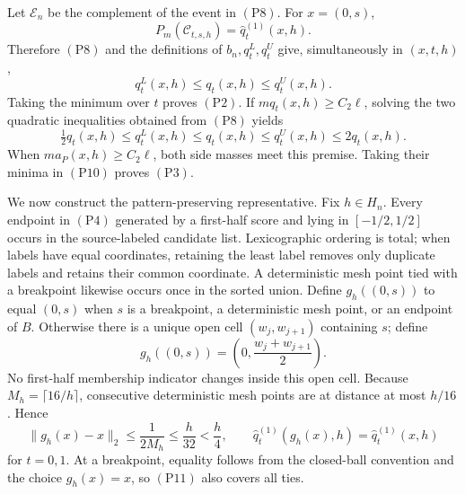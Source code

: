 Let \(\mathcal E_n\) be the complement of the event in \((\mathrm{P8})\).
For \(x=(0,s)\),
\[
 P_m(\mathcal C_{t,s,h})=\widehat q_t^{(1)}(x,h).
\]
Therefore \((\mathrm{P8})\) and the definitions of \(b_n,q_t^L,q_t^U\)
give, simultaneously in \((x,t,h)\),
\[
 q_t^L(x,h)\leq q_t(x,h)\leq q_t^U(x,h).                          \tag{P9}
\]
Taking the minimum over \(t\) proves \((\mathrm{P2})\).  If
\(mq_t(x,h)\geq C_2\ell\), solving the two quadratic inequalities obtained
from \((\mathrm{P8})\) yields
\[
 \tfrac12q_t(x,h)\leq q_t^L(x,h)
 \leq q_t(x,h)\leq q_t^U(x,h)\leq2q_t(x,h).                       \tag{P10}
\]
When \(ma_P(x,h)\geq C_2\ell\), both side masses meet this premise.
Taking their minima in \((\mathrm{P10})\) proves \((\mathrm{P3})\).

We now construct the pattern-preserving representative.  Fix \(h\in H_n\).
Every endpoint in \((\mathrm{P4})\) generated by a first-half score and lying
in \([-1/2,1/2]\) occurs in the source-labeled candidate list.  Lexicographic
ordering is total; when labels have equal coordinates, retaining the least
label removes only duplicate labels and retains their common coordinate.
A deterministic mesh point tied with a breakpoint likewise occurs once in
the sorted union.  Define \(g_h((0,s))\) to equal \((0,s)\) when \(s\) is a
breakpoint, a deterministic mesh point, or an endpoint of \(B\).  Otherwise
there is a unique open cell \((w_j,w_{j+1})\) containing \(s\); define
\[
 g_h((0,s))=\left(0,\frac{w_j+w_{j+1}}2\right).
\]
No first-half membership indicator changes inside this open cell.  Because
\(M_h=\lceil16/h\rceil\), consecutive deterministic mesh points are at
distance at most \(h/16\).  Hence
\[
 \|g_h(x)-x\|_2\leq\frac1{2M_h}\leq\frac h{32}<\frac h4,
 \qquad
 \widehat q_t^{(1)}(g_h(x),h)=\widehat q_t^{(1)}(x,h)              \tag{P11}
\]
for \(t=0,1\).  At a breakpoint, equality follows from the closed-ball
convention and the choice \(g_h(x)=x\), so \((\mathrm{P11})\) also covers all
ties.

